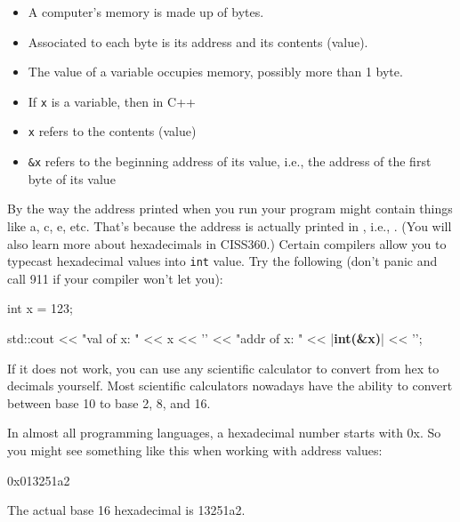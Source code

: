 \begin{itemize}
\item
  A computer's memory is made up of bytes.
\item
  Associated to each byte is its address and its contents (value).
\item
  The value of a variable occupies memory, possibly more than 1 byte.
\item
  If \texttt{x} is a variable, then in C++
\item
  \texttt{x} refers to the contents (value)
\item
  \texttt{\&x} refers to the beginning address of its value, i.e., the
  address of the first byte of its value
\end{itemize}

By the way the address printed when you run your program might contain things like a, c, e, etc. That's because the address is actually printed in , i.e., . (You will also learn more about hexadecimals in CISS360.) Certain compilers allow you to typecast hexadecimal values into \texttt{int} value. Try the following (don't panic and call 911 if your compiler won't let you):

\begin{consolethree}[escapeinside=||]
int x = 123;

std::cout << "val of x: " << x
          << '\n' << "addr of x: " << |\textbf{int(\&x)}|
          << '\n';
\end{consolethree}
If it does not work, you can use any scientific calculator to convert from hex to decimals yourself. Most scientific calculators nowadays have the ability to convert between base 10 to base 2, 8, and 16.

In almost all programming languages, a hexadecimal number starts with 0x. So you might see something like this when working with address values:
\begin{center}
0x013251a2
\end{center}
The actual base 16 hexadecimal is 13251a2.

